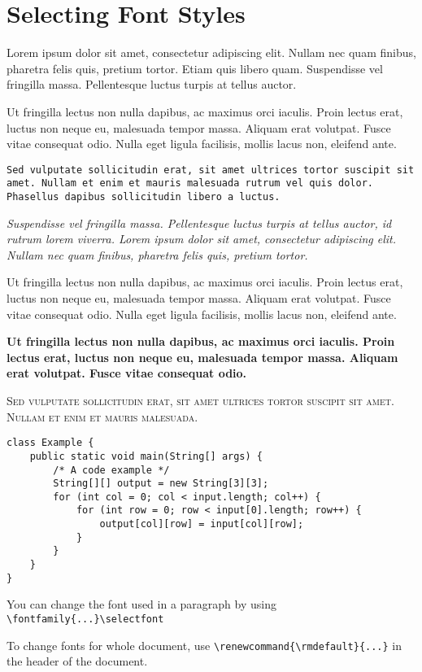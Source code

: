 \documentclass{article}
\begin{document}
\section*{Selecting Font Styles}

\bigskip\noindent\textrm{Lorem ipsum dolor sit amet, consectetur adipiscing elit. Nullam
nec quam finibus, pharetra felis quis, pretium tortor. Etiam quis libero quam.
Suspendisse vel fringilla massa. Pellentesque luctus turpis at tellus auctor.}

\bigskip\noindent\textsf{Ut fringilla lectus non nulla dapibus, ac maximus orci
iaculis. Proin lectus erat, luctus non neque eu, malesuada tempor massa. Aliquam
erat volutpat. Fusce vitae consequat odio. Nulla eget ligula facilisis, mollis
lacus non, eleifend ante.}

\bigskip\noindent\texttt{Sed vulputate sollicitudin erat, sit amet ultrices
tortor suscipit sit amet. Nullam et enim et mauris malesuada rutrum vel quis
dolor. Phasellus dapibus sollicitudin libero a luctus.} 

\bigskip\noindent\textit{Suspendisse vel fringilla massa. Pellentesque luctus
turpis at tellus auctor, id rutrum lorem viverra. Lorem ipsum dolor sit amet,
consectetur adipiscing elit. Nullam nec quam finibus, pharetra felis quis,
pretium tortor.}

\bigskip\noindent\textmd{Ut fringilla lectus non nulla dapibus, ac maximus orci
iaculis. Proin lectus erat, luctus non neque eu, malesuada tempor massa. Aliquam
erat volutpat. Fusce vitae consequat odio. Nulla eget ligula facilisis, mollis
lacus non, eleifend ante.}

\bigskip\noindent\textbf{Ut fringilla lectus non nulla dapibus, ac maximus orci
iaculis. Proin lectus erat, luctus non neque eu, malesuada tempor massa. Aliquam
erat volutpat. Fusce vitae consequat odio.}

\bigskip\noindent\textsc{Sed vulputate sollicitudin erat, sit amet ultrices
tortor suscipit sit amet. Nullam et enim et mauris malesuada.} 

\bigskip

\begin{verbatim}
class Example {
    public static void main(String[] args) {
        /* A code example */
        String[][] output = new String[3][3];
        for (int col = 0; col < input.length; col++) {
            for (int row = 0; row < input[0].length; row++) {
                output[col][row] = input[col][row];
            }
        }
    }
}
\end{verbatim}

\noindent{}\selectfont You can change the font used in a paragraph
by using \\
\texttt{\textbackslash fontfamily\{...\}\textbackslash selectfont}

\bigskip\noindent To change fonts for  whole document, use
\texttt{\textbackslash renewcommand\{\textbackslash rmdefault\}\{...\}} in the
header of the document.
\end{document}
